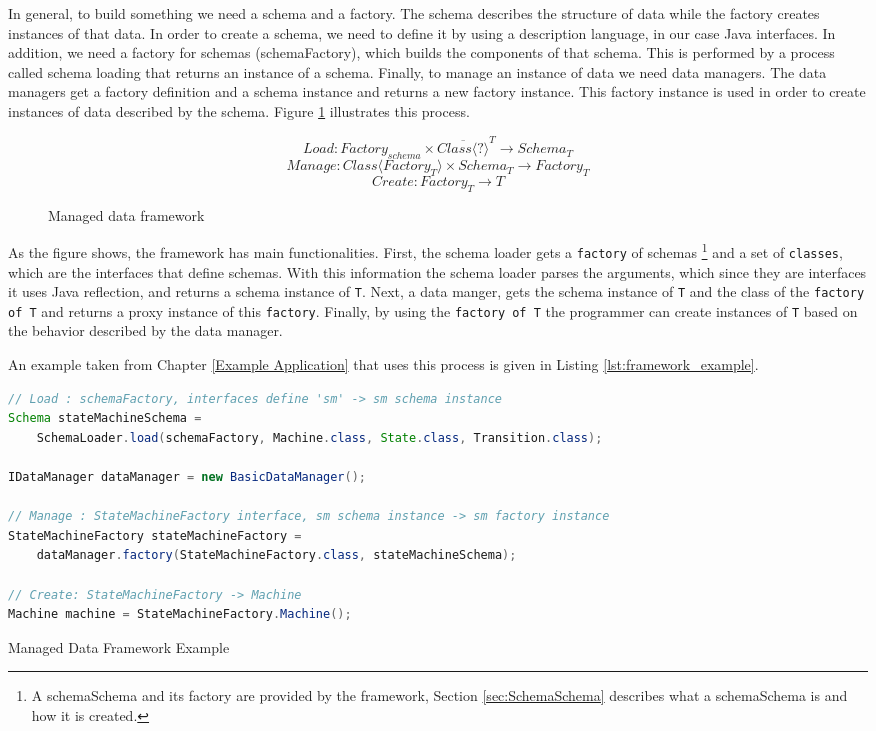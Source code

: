 In general, to build something we need a schema and a factory.
The schema describes the structure of data while the factory creates instances of that data.
In order to create a schema, we need to define it by using a description language, in our case Java interfaces.
In addition, we need a factory for schemas (schemaFactory), which builds the components of that schema.
This is performed by a process called schema loading that returns an instance of a schema.
Finally, to manage an instance of data we need data managers. 
The data managers get a factory definition and a schema instance and returns a new factory instance.
This factory instance is used in order to create instances of data described by the schema.
Figure \ref{fig:formal_metamodel} illustrates this process.

\begin{figure}[H]
\centering
\[Load   : Factory_{schema} \times \overline{Class\langle ? \rangle}^{T} \rightarrow Schema_{T} \nonumber \]
\[Manage : Class\langle Factory_{T}\rangle \times Schema_{T} \rightarrow Factory_{T} \nonumber \]
\[Create : Factory_{T} \rightarrow T \nonumber\]

\caption{Managed data framework}
\label{fig:formal_metamodel}
\end{figure}

As the figure shows, the framework has main functionalities.
First, the schema loader gets a \texttt{factory} of schemas
\footnote{
	A schemaSchema and its factory are provided by the framework, Section \ref{sec:SchemaSchema} describes what a schemaSchema is and how it is created.} 
and a set of \texttt{classes}, which are the interfaces that define schemas.
With this information the schema loader parses the arguments, which since they are interfaces it uses Java reflection, and returns a schema instance of \texttt{T}.
Next, a data manger, gets the schema instance of \texttt{T} and the class of the \texttt{factory of T} and returns a proxy instance of this \texttt{factory}.
Finally, by using the \texttt{factory of T} the programmer can create instances of \texttt{T} based on the behavior described by the data manager.

An example taken from Chapter \ref{Example Application} that uses this process is given in Listing \ref{lst:framework_example}.

\begin{sourcecode}
	\begin{lstlisting}[language=Java, escapechar=|]
// Load : schemaFactory, interfaces define 'sm' -> sm schema instance
Schema stateMachineSchema =
	SchemaLoader.load(schemaFactory, Machine.class, State.class, Transition.class);

IDataManager dataManager = new BasicDataManager();

// Manage : StateMachineFactory interface, sm schema instance -> sm factory instance
StateMachineFactory stateMachineFactory = 
	dataManager.factory(StateMachineFactory.class, stateMachineSchema);

// Create: StateMachineFactory -> Machine
Machine machine = StateMachineFactory.Machine();
	\end{lstlisting}
	\caption{Managed Data Framework Example}
	\label{lst:framework_example}
\end{sourcecode}

